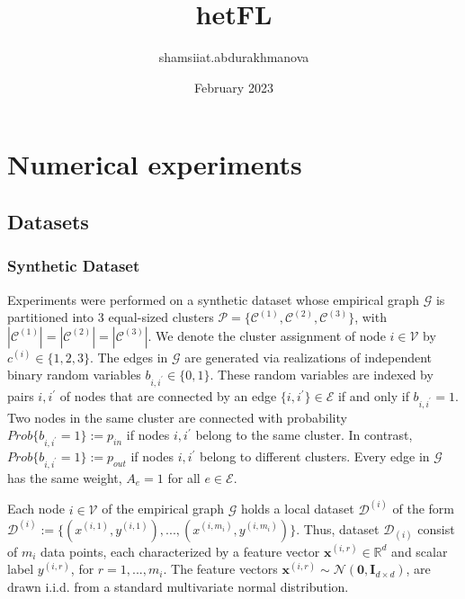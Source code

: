 \documentclass{article}
\title{hetFL}
\author{shamsiiat.abdurakhmanova }
\date{February 2023}
\begin{document}
\maketitle

\section{Numerical experiments}

\subsection{Datasets}

\subsubsection{Synthetic Dataset}

Experiments were performed on a synthetic dataset whose empirical graph $\mathcal {G}$ is partitioned into 3 equal-sized clusters $\mathcal{P} = \{\mathcal{C}^{(1)}, \mathcal{C}^{(2)}, \mathcal{C}^{(3)}\}$, with $|\mathcal{C}^{(1)}|=|\mathcal{C}^{(2)}|=|\mathcal{C}^{(3)}|$. We denote the cluster assignment of node $i \in \mathcal{V}$ by ${c}^{(i)} \in \{1,2,3\}$. The edges in $\mathcal {G}$  are generated via realizations of independent binary random variables ${b}_{i,{i}^{'}} \in \{0,1\}$. These random variables are indexed by pairs $i,{i}^{'}$ of nodes that are connected by an edge $\{i,{i}^{'}\} \in \mathcal{E}$ if and only if ${b}_{i,{i}^{'}}=1$. \\
Two nodes in the same cluster are connected with probability $Prob\{{b}_{i,{i}^{'}}=1\} :={p}_{in}$ if nodes $i,{i}^{'}$ belong to the same cluster. In contrast, $Prob\{{b}_{i,{i}^{'}}=1\} :={p}_{out}$ if nodes $i,{i}^{'}$ belong to different clusters. Every edge in  $\mathcal {G}$ has the same weight, ${A}_{e}=1$ for all $e \in \mathcal{E}$.

Each node $i \in \mathcal {V}$ of the empirical graph $\mathcal {G}$ holds a local dataset $\mathcal {D}^{(i)}$ of the form $\mathcal {D}^{(i)} := \{ ({x}^{(i,1)}, {y}^{(i,1)}), ..., ({x}^{(i,{m}_{i})}, {y}^{(i,{m}_{i})}) \}$. Thus, dataset $\mathcal {D}_{(i)}$ consist of ${m}_{i}$ data points, each characterized by a feature vector $\mathbf{x}^{(i,r)} \in \mathbb{R}^{d}$ and scalar label ${y}^{(i,r)}$, for $r=1,...,{m}_{i}$. The feature vectors $\mathbf{x}^{(i,r)} \sim \mathcal{N}(\mathbf{0},\mathbf{I}_{d \times d})$, are drawn i.i.d. from a standard multivariate normal distribution. 
\end{document}
